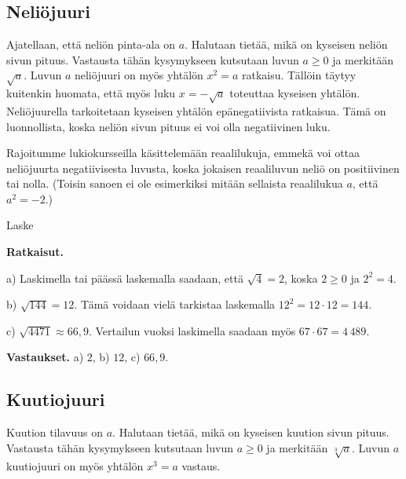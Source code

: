 \subsection*{Neliöjuuri}
\label{neliojuuri}

Ajatellaan, että neliön pinta-ala on $a$. Halutaan tietää, mikä on kyseisen neliön sivun pituus. Vastausta tähän kysymykseen kutsutaan luvun $a\ge 0$  ja merkitään $\sqrt{a}$. Luvun $a$ neliöjuuri on myös yhtälön $x^2 = a$ ratkaisu. Tällöin täytyy kuitenkin huomata, että myös luku $x=-\sqrt{a}$ toteuttaa kyseisen yhtälön. Neliöjuurella tarkoitetaan kyseisen yhtälön epänegatiivista ratkaisua. Tämä on luonnollista, koska neliön sivun pituus ei voi olla negatiivinen luku.


Rajoitumme lukiokursseilla käsittelemään reaalilukuja, emmekä voi ottaa neliöjuurta negatiivisesta luvusta, koska jokaisen reaaliluvun neliö on positiivinen tai nolla. (Toisin sanoen ei ole esimerkiksi mitään sellaista reaalilukua $a$, että $a^2=-2$.)

\begin{esimerkki}
Laske
\begin{alakohdat}


\end{alakohdat}

{\bf Ratkaisut.}

a)
Laskimella tai päässä laskemalla saadaan, että $\sqrt{4} = 2$, koska $2\geq0$ ja $2^2 =4$.

b) 
$\sqrt{144}=12$. Tämä voidaan vielä tarkistaa laskemalla $12^2 = 12\cdot 12=144$.

c)
$\sqrt{4471}\approx 66,9$. Vertailun vuoksi laskimella saadaan myös $67\cdot 67=4\,489$.

{\bf Vastaukset.}
a) $2$, b) $12$, c) $66,9$.

\end{esimerkki}


\subsection*{Kuutiojuuri}

Kuution tilavuus on $a$. Halutaan tietää, mikä on kyseisen kuution sivun pituus. Vastausta tähän kysymykseen kutsutaan luvun $a\ge 0$  ja merkitään $\sqrt[3]{a}$. Luvun $a$ kuutiojuuri on myös yhtälön $x^3 = a$ vastaus.


